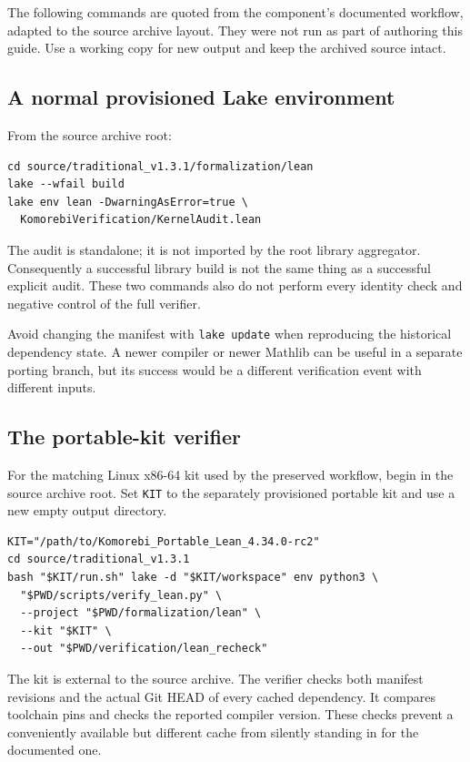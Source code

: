 \documentclass[11pt,a4paper]{article}
\newcommand{\code}[1]{\nolinkurl{#1}}
\begin{document}
The following commands are quoted from the component's documented workflow, adapted to the source archive layout. They were not run as part of authoring this guide. Use a working copy for new output and keep the archived source intact.

\subsection{A normal provisioned Lake environment}

From the source archive root:
\begin{lstlisting}
cd source/traditional_v1.3.1/formalization/lean
lake --wfail build
lake env lean -DwarningAsError=true \
  KomorebiVerification/KernelAudit.lean
\end{lstlisting}

The audit is standalone; it is not imported by the root library aggregator. Consequently a successful library build is not the same thing as a successful explicit audit. These two commands also do not perform every identity check and negative control of the full verifier.

Avoid changing the manifest with \code{lake update} when reproducing the historical dependency state. A newer compiler or newer Mathlib can be useful in a separate porting branch, but its success would be a different verification event with different inputs.

\subsection{The portable-kit verifier}

For the matching Linux x86-64 kit used by the preserved workflow, begin in the source archive root. Set \code{KIT} to the separately provisioned portable kit and use a new empty output directory.
\begin{lstlisting}
KIT="/path/to/Komorebi_Portable_Lean_4.34.0-rc2"
cd source/traditional_v1.3.1
bash "$KIT/run.sh" lake -d "$KIT/workspace" env python3 \
  "$PWD/scripts/verify_lean.py" \
  --project "$PWD/formalization/lean" \
  --kit "$KIT" \
  --out "$PWD/verification/lean_recheck"
\end{lstlisting}

The kit is external to the source archive. The verifier checks both manifest revisions and the actual Git HEAD of every cached dependency. It compares toolchain pins and checks the reported compiler version. These checks prevent a conveniently available but different cache from silently standing in for the documented one.
\end{document}
